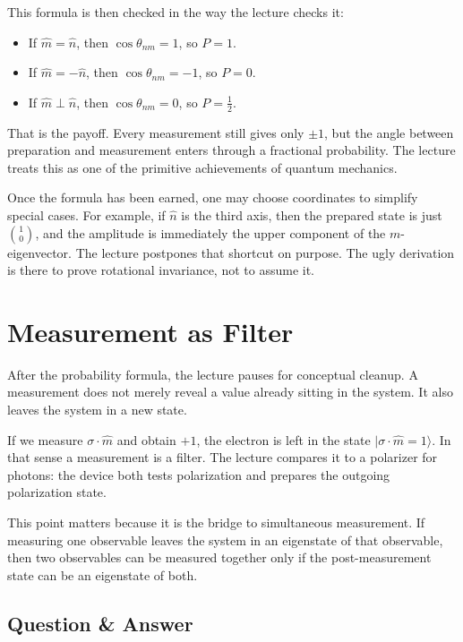 This formula is then checked in the way the lecture checks it:
\begin{itemize}
\item If \(\hat m=\hat n\), then \(\cos\theta_{nm}=1\), so \(P=1\).
\item If \(\hat m=-\hat n\), then \(\cos\theta_{nm}=-1\), so \(P=0\).
\item If \(\hat m\perp\hat n\), then \(\cos\theta_{nm}=0\), so \(P=\tfrac12\).
\end{itemize}

That is the payoff. Every measurement still gives only \(\pm1\), but the angle between preparation and measurement enters through a fractional probability. The lecture treats this as one of the primitive achievements of quantum mechanics.

\begin{remark}
Once the formula has been earned, one may choose coordinates to simplify special cases. For example, if \(\hat n\) is the third axis, then the prepared state is just \(\binom{1}{0}\), and the amplitude is immediately the upper component of the \(m\)-eigenvector. The lecture postpones that shortcut on purpose. The ugly derivation is there to prove rotational invariance, not to assume it.
\end{remark}

\section{Measurement as Filter}

After the probability formula, the lecture pauses for conceptual cleanup. A measurement does not merely reveal a value already sitting in the system. It also leaves the system in a new state.

If we measure \(\sigma\cdot\hat m\) and obtain \(+1\), the electron is left in the state \(|\sigma\cdot\hat m=1\rangle\). In that sense a measurement is a filter. The lecture compares it to a polarizer for photons: the device both tests polarization and prepares the outgoing polarization state.

This point matters because it is the bridge to simultaneous measurement. If measuring one observable leaves the system in an eigenstate of that observable, then two observables can be measured together only if the post-measurement state can be an eigenstate of both.

\subsection{Question \& Answer}

